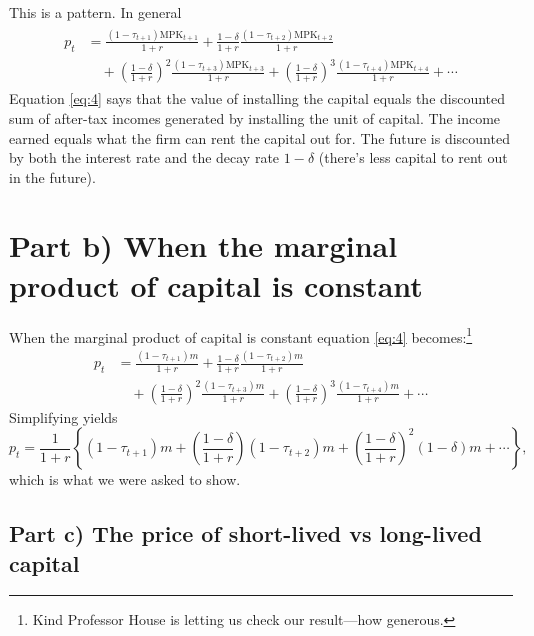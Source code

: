\documentclass[12pt]{pracjourn_rwr}
\theoremstyle{definition}
\theoremstyle{remark}
\begin{document}
This is a pattern.
In general
\begin{align}
\label{eq:4}
\begin{split}
p_{t} &= \frac{(1-\tau_{t+1}) \text{MPK}_{t+1}}{1+r} + \frac{1-\delta}{1+r} \frac{(1-\tau_{t+2}) \text{MPK}_{t+2}}{1+r} \\
&\quad + \left( \frac{1-\delta}{1+r}  \right)^{2} \frac{(1-\tau_{t+3}) \text{MPK}_{t+3}}{1+r}
+ \left( \frac{1-\delta}{1+r}  \right)^{3} \frac{(1-\tau_{t+4}) \text{MPK}_{t+4}}{1+r} + \cdots
\end{split}
\end{align}
Equation \eqref{eq:4} says that the value of installing the capital equals the discounted sum of after-tax incomes generated by installing the unit of capital.
The income earned equals what the firm can rent the capital out for.
The future is discounted by both the interest rate and the decay rate $1-\delta$ (there's less capital to rent out in the future).

\section{Part b) When the marginal product of capital is constant}

When the marginal product of capital is constant equation \eqref{eq:4} becomes:\footnote{Kind Professor House is letting us check our result---how generous.}
\begin{align*}
p_{t} &= \frac{(1-\tau_{t+1}) m}{1+r} + \frac{1-\delta}{1+r} \frac{(1-\tau_{t+2}) m}{1+r} \\
&\quad + \left( \frac{1-\delta}{1+r}  \right)^{2} \frac{(1-\tau_{t+3}) m}{1+r}
+ \left( \frac{1-\delta}{1+r}  \right)^{3} \frac{(1-\tau_{t+4}) m}{1+r} + \cdots
\end{align*}
Simplifying yields
\begin{equation}
\label{eq:5}
p_{t} = \frac{1}{1+r} \left\{
(1-\tau_{t+1})m + \left( \frac{1-\delta}{1+r} \right) (1-\tau_{t+2})m + \left( \frac{1-\delta}{1+r} \right)^{2}(1-\delta) m + \cdots
\right\},
\end{equation}
which is what we were asked to show.

\subsection{Part c) The price of short-lived vs long-lived capital}
\end{document}
